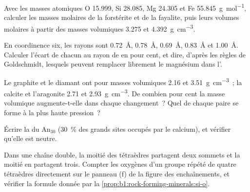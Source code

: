 \begin{exercise}[$\star$]\label{exo:b1:rock-forming-minerals:2}
Avec les masses atomiques O \num{15.999}, Si \num{28.085}, Mg \num{24.305} et
Fe \qty{55.845}{g.mol^{-1}}, calculer les masses molaires de la forstérite et de
la fayalite, puis leurs volumes molaires à partir des masses volumiques
\num{3.275} et \qty{4.392}{g.cm^{-3}}.
\end{exercise}

\begin{exercise}[$\star$]\label{exo:b1:rock-forming-minerals:3}
En coordinence six, les rayons sont  \qty{0.72}{\angstrom},
 \qty{0.78}{\angstrom},  \qty{0.69}{\angstrom},
 \qty{0.83}{\angstrom} et  \qty{1.00}{\angstrom}.
Calculer l'écart de chacun au rayon de  en pour cent, et dire,
d'après les règles de Goldschmidt, lesquels peuvent remplacer librement le
magnésium dans l'.
\end{exercise}

\begin{exercise}[$\star$]\label{exo:b1:rock-forming-minerals:4}
Le graphite et le diamant ont pour masses volumiques \num{2.16} et
\qty{3.51}{g.cm^{-3}}~; la calcite et l'aragonite \num{2.71} et
\qty{2.93}{g.cm^{-3}}. De combien pour cent la masse volumique augmente-t-elle
dans chaque changement~? Quel  de chaque paire se forme à la plus haute
pression~?
\end{exercise}

\begin{exercise}[$\star\star$]\label{exo:b1:rock-forming-minerals:5}
Écrire la  du  $\text{An}_{30}$ (\qty{30}{\percent}
des grands sites occupés par le calcium), et vérifier qu'elle est neutre.
\end{exercise}

\begin{exercise}[$\star\star$]\label{exo:b1:rock-forming-minerals:6}
Dans une chaîne double, la moitié des tétraèdres partagent deux sommets et la
moitié en partagent trois. Compter les oxygènes d'un groupe répété de quatre
tétraèdres directement sur le panneau (f) de la figure des enchaînements, et
vérifier la formule  donnée par la
\cref{prop:b1:rock-forming-minerals:si-o}.
\end{exercise}

